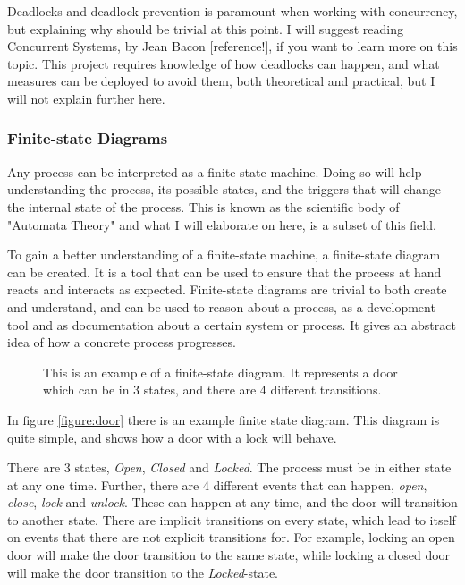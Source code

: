 \documentclass[a4paper]{article}
\begin{document}
Deadlocks and deadlock prevention is paramount when working with concurrency, but explaining why should be trivial at this point. I will suggest reading Concurrent Systems, by Jean Bacon [reference!], if you want to learn more on this topic. This project requires knowledge of how deadlocks can happen, and what measures can be deployed to avoid them, both theoretical and practical, but I will not explain further here.


\subsubsection{Finite-state Diagrams}
Any process can be interpreted as a finite-state machine. Doing so will help understanding the process, its possible states, and the triggers that will change the internal state of the process. This is known as the scientific body of "Automata Theory" and what I will elaborate on here, is a subset of this field.

To gain a better understanding of a finite-state machine, a finite-state diagram can be created. It is a tool that can be used to ensure that the process at hand reacts and interacts as expected. Finite-state diagrams are trivial to both create and understand, and can be used to reason about a process, as a development tool and as documentation about a certain system or process. It gives an abstract idea of how a concrete process progresses.\\

\begin{figure}
	\begin{adjustwidth}{-0.5in}{-0.5in}
    \centering
    \def\svgwidth{\columnwidth}
    
  	\caption{This is an example of a finite-state diagram. It represents a door which can be in 3 states, and there are 4 different transitions.}
	\label{figure:door}
	\end{adjustwidth}
\end{figure}

In figure \autoref{figure:door} there is an example finite state diagram. This diagram is quite simple, and shows how a door with a lock will behave.

There are 3 states, \textit{Open}, \textit{Closed} and \textit{Locked}. The process must be in either state at any one time. Further, there are 4 different events that can happen, \textit{open}, \textit{close}, \textit{lock} and \textit{unlock}. These can happen at any time, and the door will transition to another state. There are implicit transitions on every state, which lead to itself on events that there are not explicit transitions for. For example, locking an open door will make the door transition to the same state, while locking a closed door will make the door transition to the \textit{Locked}-state.\\
\end{document}

